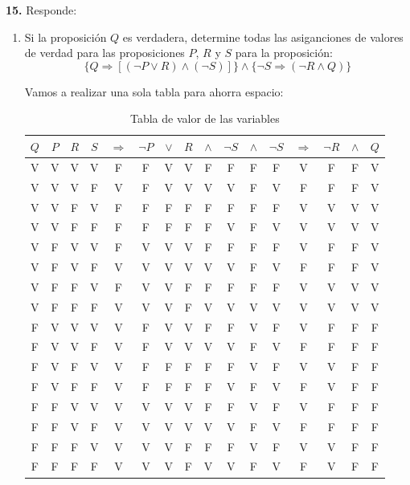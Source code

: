 \documentclass[12pt]{article}
\begin{document}
%
%
\textbf{15.} Responde:

\begin{enumerate}[label=\alph*)]
    \item Si la proposición $Q$ es verdadera, determine todas las asiganciones de valores de
    verdad para las proposiciones $P$, $R$ y $S$ para la proposición:
    \[\{Q \Longrightarrow [(\neg P \lor R) \land (\neg S)]\} \land \{\neg S \Longrightarrow (\neg R \land Q)\}\]
    
    Vamos a realizar una sola tabla para ahorra espacio:
    \begin{table}[h!]
        \centering
        \begin{tabular}{|c|c|c|c|||c|||c|c|c||c||c||||c||||c|||c|||c|c|c|}
            \hline
            $Q$ & $P$ & $R$ & $S$ & $\Longrightarrow$ & $\neg P$ & $\lor$ & $R$ & $\land$ & $\neg S$ & $\land$ & $\neg S$ & $\Longrightarrow$ & $\neg R$ & $\land$ & $Q$\\
            \hline
            V & V & V & V & F & F & V & V & F & F & F & F & V & F & F & V\\
            V & V & V & F & V & F & V & V & V & V & F & V & F & F & F & V\\
            V & V & F & V & F & F & F & F & F & F & F & F & V & V & V & V\\
            V & V & F & F & F & F & F & F & F & V & F & V & V & V & V & V\\
            V & F & V & V & F & V & V & V & F & F & F & F & V & F & F & V\\
            V & F & V & F & V & V & V & V & V & V & F & V & F & F & F & V\\
            V & F & F & V & F & V & V & F & F & F & F & F & V & V & V & V\\
            V & F & F & F & V & V & V & F & V & V & V & V & V & V & V & V\\
            F & V & V & V & V & F & V & V & F & F & V & F & V & F & F & F\\
            F & V & V & F & V & F & V & V & V & V & F & V & F & F & F & F\\
            F & V & F & V & V & F & F & F & F & F & V & F & V & V & F & F\\
            F & V & F & F & V & F & F & F & F & V & F & V & F & V & F & F\\
            F & F & V & V & V & V & V & V & F & F & V & F & V & F & F & F\\
            F & F & V & F & V & V & V & V & V & V & F & V & F & F & F & F\\
            F & F & F & V & V & V & V & F & F & F & V & F & V & V & F & F\\
            F & F & F & F & V & V & V & F & V & V & F & V & F & V & F & F\\
            \hline           
        \end{tabular}
        \caption{Tabla de valor de las variables}
    \end{table}
    
\end{enumerate}
\end{document}
